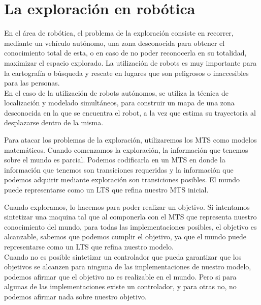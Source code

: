 \section{La exploración en robótica}

En el área de robótica, el problema de la exploración consiste en recorrer, mediante un vehículo autónomo, una zona
desconocida para obtener el conocimiento total de esta, o en caso de no poder reconocerla en su totalidad, maximizar el
espacio explorado. La utilización de robots es muy importante para la cartografía o búsqueda y rescate en lugares que
son peligrosos o inaccesibles para las personas.\\
En el caso de la utilización de robots autónomos, se utiliza la técnica de localización y modelado simultáneos, para 
construir un mapa de una zona desconocida en la que se encuentra el robot, a la vez que estima su trayectoria al 
desplazarse dentro de la misma.

\vspace{\baselineskip}
Para atacar los problemas de la exploración, utilizaremos los MTS como modelos matemáticos.
Cuando comenzamos la exploración, la información que tenemos sobre el mundo es parcial. Podemos codificarla en un MTS en donde la información que tenemos son transiciones requeridas y la información que podemos adquirir mediante exploración son transiciones posibles. El mundo puede representarse como un LTS que refina nuestro MTS inicial.

\vspace{\baselineskip}
Cuando exploramos, lo hacemos para poder realizar un objetivo. Si intentamos sintetizar una maquina tal que al componerla con el MTS que representa nuestro conocimiento del mundo, para todas las implementaciones posibles, el objetivo es alcanzable, sabemos que podemos cumplir el objetivo, ya que el mundo puede representarse como un LTS que refina nuestro modelo.\\
Cuando no es posible sintetizar un controlador que pueda garantizar que los objetivos se alcanzen para ninguna de las implementaciones de nuestro modelo, podemos afirmar que el objetivo no es realizable en el mundo. Pero si para algunas de las implementaciones existe un controlador, y para otras no, no podemos afirmar nada sobre nuestro objetivo.